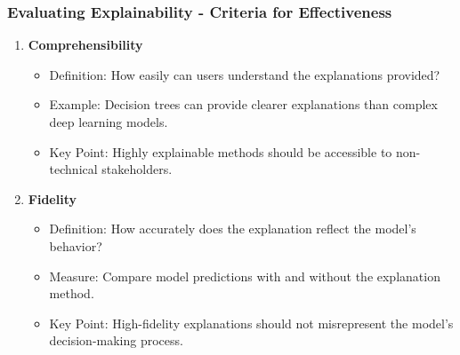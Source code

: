 \documentclass[aspectratio=169]{beamer}
\begin{document}
\begin{frame}[fragile]
  \frametitle{Evaluating Explainability - Criteria for Effectiveness}
  \begin{enumerate}
    \item \textbf{Comprehensibility}
      \begin{itemize}
        \item Definition: How easily can users understand the explanations provided?
        \item Example: Decision trees can provide clearer explanations than complex deep learning models.
        \item Key Point: Highly explainable methods should be accessible to non-technical stakeholders.
      \end{itemize}

    \item \textbf{Fidelity}
      \begin{itemize}
        \item Definition: How accurately does the explanation reflect the model's behavior?
        \item Measure: Compare model predictions with and without the explanation method.
        \item Key Point: High-fidelity explanations should not misrepresent the model's decision-making process.
      \end{itemize}
  \end{enumerate}
\end{frame}
\end{document}
